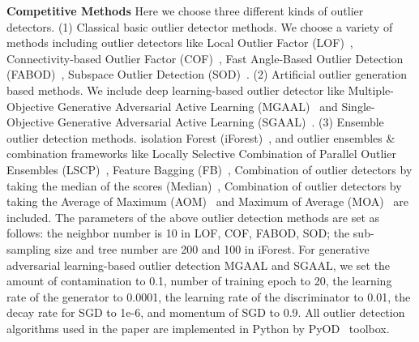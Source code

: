 \documentclass[sigconf,nonacm]{acmart}
\begin{document}
\noindent\textbf{Competitive Methods} Here we choose three different kinds of outlier detectors. (1) Classical basic outlier detector methods. We choose a variety of methods including outlier detectors like Local Outlier Factor (LOF)~\textcolor{gray}{\cite{Breunig00SIR}}, Connectivity-based Outlier Factor (COF)~\textcolor{gray}{\cite{Tang02PKDD}}, Fast Angle-Based Outlier Detection (FABOD)~\textcolor{gray}{\cite{kriegel2008angle}}, Subspace Outlier Detection (SOD)~\textcolor{gray}{\cite{10.1007/978-3-642-01307-2_86}}. (2) Artificial outlier generation based methods. We include deep learning-based outlier detector like Multiple-Objective Generative Adversarial Active Learning (MGAAL)~\textcolor{gray}{\cite{liu2019generative}} and Single-Objective Generative Adversarial Active Learning (SGAAL)~\textcolor{gray}{\cite{liu2019generative}}. (3) Ensemble outlier detection methods. isolation Forest (iForest)~\textcolor{gray}{\cite{LiuFei2008}}, and outlier ensembles \& combination frameworks like Locally Selective Combination of Parallel Outlier Ensembles (LSCP)~\textcolor{gray}{\cite{DBLP:journals/corr/abs-1812-01528}}, Feature Bagging (FB)~\textcolor{gray}{\cite{Aggarwal2015TheoreticalFA}}, Combination of outlier detectors by taking the median of the scores (Median)~\textcolor{gray}{\cite{Aggarwal2015TheoreticalFA}}, Combination of outlier detectors by taking the Average of Maximum (AOM)~\textcolor{gray}{\cite{Aggarwal2015TheoreticalFA}} and Maximum of Average (MOA)~\textcolor{gray}{\cite{Aggarwal2015TheoreticalFA}} are included. The parameters of the above outlier detection methods are set as follows: the neighbor number is 10 in LOF, COF, FABOD, SOD; the sub-sampling size and tree number are 200 and 100 in iForest. For generative adversarial learning-based outlier detection MGAAL and SGAAL, we set the amount of contamination to 0.1, number of training epoch to 20, the learning rate of the generator to 0.0001, the learning rate of the discriminator to 0.01, the decay rate for SGD to 1e-6, and momentum of SGD to 0.9. All outlier detection algorithms used in the paper are implemented in Python by PyOD~\textcolor{gray}{\cite{zhao2019pyod}} toolbox.
\end{document}
